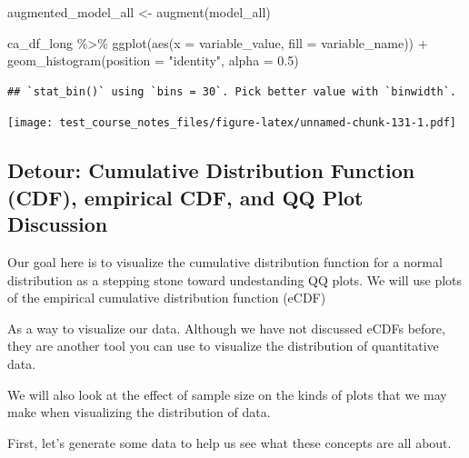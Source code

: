 \documentclass[
]{book}
\newenvironment{Shaded}{\begin{snugshade}}{\end{snugshade}}
\newcommand{\AttributeTok}[1]{\textcolor[rgb]{0.77,0.63,0.00}{#1}}
\newcommand{\FloatTok}[1]{\textcolor[rgb]{0.00,0.00,0.81}{#1}}
\newcommand{\FunctionTok}[1]{\textcolor[rgb]{0.00,0.00,0.00}{#1}}
\newcommand{\NormalTok}[1]{#1}
\newcommand{\OtherTok}[1]{\textcolor[rgb]{0.56,0.35,0.01}{#1}}
\newcommand{\SpecialCharTok}[1]{\textcolor[rgb]{0.00,0.00,0.00}{#1}}
\newcommand{\StringTok}[1]{\textcolor[rgb]{0.31,0.60,0.02}{#1}}
\begin{document}
\begin{Shaded}
\begin{Highlighting}[]
\NormalTok{augmented\_model\_all }\OtherTok{\textless{}{-}} \FunctionTok{augment}\NormalTok{(model\_all)}
\end{Highlighting}
\end{Shaded}

\begin{Shaded}
\begin{Highlighting}[]
\NormalTok{ca\_df\_long }\SpecialCharTok{\%\textgreater{}\%} 
  \FunctionTok{ggplot}\NormalTok{(}\FunctionTok{aes}\NormalTok{(}\AttributeTok{x =}\NormalTok{ variable\_value, }\AttributeTok{fill =}\NormalTok{ variable\_name)) }\SpecialCharTok{+}
  \FunctionTok{geom\_histogram}\NormalTok{(}\AttributeTok{position =} \StringTok{"identity"}\NormalTok{, }\AttributeTok{alpha =} \FloatTok{0.5}\NormalTok{)}
\end{Highlighting}
\end{Shaded}

\begin{verbatim}
## `stat_bin()` using `bins = 30`. Pick better value with `binwidth`.
\end{verbatim}

\texttt{[image: test\_course\_notes\_files/figure-latex/unnamed-chunk-131-1.pdf]}

\hypertarget{detour-cumulative-distribution-function-cdf-empirical-cdf-and-qq-plot-discussion}{%
\subsection{Detour: Cumulative Distribution Function (CDF), empirical CDF, and QQ Plot Discussion}\label{detour-cumulative-distribution-function-cdf-empirical-cdf-and-qq-plot-discussion}}

Our goal here is to visualize the cumulative distribution function for a normal distribution as a stepping stone toward undestanding QQ plots. We will use plots of the empirical cumulative distribution function (eCDF)

As a way to visualize our data. Although we have not discussed eCDFs before, they are another tool you can use to visualize the distribution of quantitative data.

We will also look at the effect of sample size on the kinds of plots that we may make when visualizing the distribution of data.

First, let's generate some data to help us see what these concepts are all about.
\end{document}
